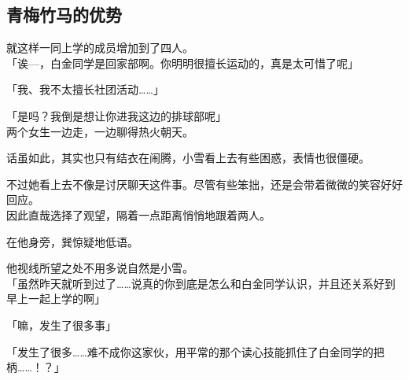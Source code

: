 \subsection{青梅竹马的优势}

就这样一同上学的成员增加到了四人。\\

「诶—，白金同学是回家部啊。你明明很擅长运动的，真是太可惜了呢」

「我、我不太擅长社团活动……」

「是吗？我倒是想让你进我这边的排球部呢」\\

两个女生一边走，一边聊得热火朝天。

话虽如此，其实也只有结衣在闹腾，小雪看上去有些困惑，表情也很僵硬。

不过她看上去不像是讨厌聊天这件事。尽管有些笨拙，还是会带着微微的笑容好好回应。\\

因此直哉选择了观望，隔着一点距离悄悄地跟着两人。

在他身旁，巽惊疑地低语。

他视线所望之处不用多说自然是小雪。\\

「虽然昨天就听到过了……说真的你到底是怎么和白金同学认识，并且还关系好到早上一起上学的啊」

「嘛，发生了很多事」

「发生了很多……难不成你这家伙，用平常的那个读心技能抓住了白金同学的把柄……！？」

